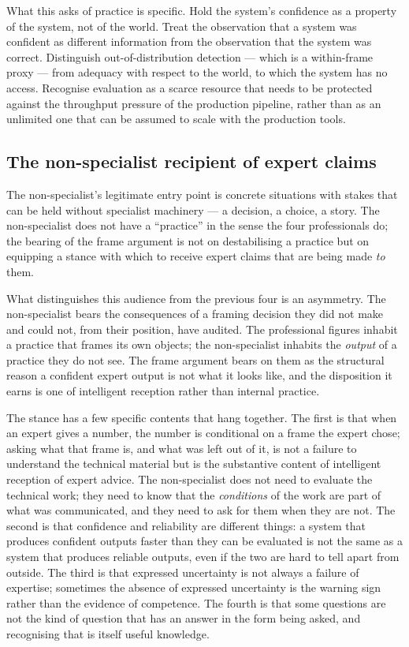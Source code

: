 \documentclass[11pt,a4paper]{article}
\begin{document}
What this asks of practice is specific. Hold the system's confidence as
a property of the system, not of the world. Treat the observation that a
system was confident as different information from the observation that
the system was correct. Distinguish out-of-distribution detection ---
which is a within-frame proxy --- from adequacy with respect to the
world, to which the system has no access. Recognise evaluation as a
scarce resource that needs to be protected against the throughput
pressure of the production pipeline, rather than as an unlimited one
that can be assumed to scale with the production tools.

\subsection{The non-specialist recipient of expert claims}
\label{sec:layperson}

The non-specialist's legitimate entry point is concrete situations with
stakes that can be held without specialist machinery --- a decision, a
choice, a story. The non-specialist does not have a ``practice'' in the
sense the four professionals do; the bearing of the frame argument is
not on destabilising a practice but on equipping a stance with which to
receive expert claims that are being made \emph{to} them.

What distinguishes this audience from the previous four is an asymmetry.
The non-specialist bears the consequences of a framing decision they did
not make and could not, from their position, have audited. The
professional figures inhabit a practice that frames its own objects; the
non-specialist inhabits the \emph{output} of a practice they do not see.
The frame argument bears on them as the structural reason a confident
expert output is not what it looks like, and the disposition it earns is
one of intelligent reception rather than internal practice.

The stance has a few specific contents that hang together. The first is
that when an expert gives a number, the number is conditional on a frame
the expert chose; asking what that frame is, and what was left out of
it, is not a failure to understand the technical material but is the
substantive content of intelligent reception of expert advice. The
non-specialist does not need to evaluate the technical work; they need
to know that the \emph{conditions} of the work are part of what was
communicated, and they need to ask for them when they are not. The
second is that confidence and reliability are different things: a system
that produces confident outputs faster than they can be evaluated is not
the same as a system that produces reliable outputs, even if the two are
hard to tell apart from outside. The third is that expressed uncertainty
is not always a failure of expertise; sometimes the absence of expressed
uncertainty is the warning sign rather than the evidence of competence.
The fourth is that some questions are not the kind of question that has
an answer in the form being asked, and recognising that is itself useful
knowledge.
\end{document}
